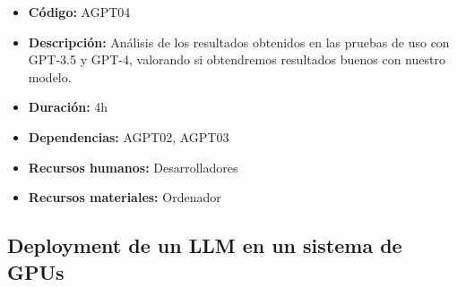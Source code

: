 \begin{itemize}
        \begin{itemize}
            \item \textbf{Código:} AGPT04
            \item \textbf{Descripción:} Análisis de los resultados obtenidos en las pruebas de uso con GPT-3.5 y GPT-4, 
                valorando si obtendremos resultados buenos con nuestro modelo.
            \item \textbf{Duración:} 4h
            \item \textbf{Dependencias:} AGPT02, AGPT03
            \item \textbf{Recursos humanos:} Desarrolladores
            \item \textbf{Recursos materiales:} Ordenador
        \end{itemize}
\end{itemize}

\subsection{Deployment de un LLM en un sistema de GPUs}
\label{subsec:tareas_gpu}


